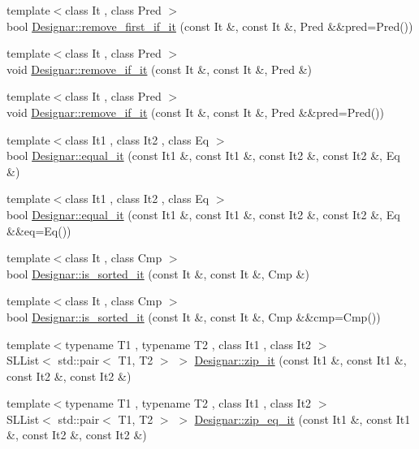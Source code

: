 \begin{DoxyCompactItemize}
{\footnotesize template$<$class It , class Pred $>$ }\\bool \hyperlink{namespace_designar_aaee4724db923890d1f8a85009922805f}{Designar\+::remove\+\_\+first\+\_\+if\+\_\+it} (const It \&, const It \&, Pred \&\&pred=Pred())
\item 
{\footnotesize template$<$class It , class Pred $>$ }\\void \hyperlink{namespace_designar_a4d9b53ca57cf3e6a1baf14e495c974a7}{Designar\+::remove\+\_\+if\+\_\+it} (const It \&, const It \&, Pred \&)
\item 
{\footnotesize template$<$class It , class Pred $>$ }\\void \hyperlink{namespace_designar_afe463efc1ccacf9b22f6e5ea0619b2ac}{Designar\+::remove\+\_\+if\+\_\+it} (const It \&, const It \&, Pred \&\&pred=Pred())
\item 
{\footnotesize template$<$class It1 , class It2 , class Eq $>$ }\\bool \hyperlink{namespace_designar_a72be3d25570a225bb5e468e62dd73984}{Designar\+::equal\+\_\+it} (const It1 \&, const It1 \&, const It2 \&, const It2 \&, Eq \&)
\item 
{\footnotesize template$<$class It1 , class It2 , class Eq $>$ }\\bool \hyperlink{namespace_designar_a022cf72b1e28929770af36d322a89c9d}{Designar\+::equal\+\_\+it} (const It1 \&, const It1 \&, const It2 \&, const It2 \&, Eq \&\&eq=Eq())
\item 
{\footnotesize template$<$class It , class Cmp $>$ }\\bool \hyperlink{namespace_designar_a2f33378e3e21b1dda9bbfa0c5537c174}{Designar\+::is\+\_\+sorted\+\_\+it} (const It \&, const It \&, Cmp \&)
\item 
{\footnotesize template$<$class It , class Cmp $>$ }\\bool \hyperlink{namespace_designar_a201bc6cc5dcc9525bc150e658a81ddbc}{Designar\+::is\+\_\+sorted\+\_\+it} (const It \&, const It \&, Cmp \&\&cmp=Cmp())
\item 
{\footnotesize template$<$typename T1 , typename T2 , class It1 , class It2 $>$ }\\S\+L\+List$<$ std\+::pair$<$ T1, T2 $>$ $>$ \hyperlink{namespace_designar_a16eafe2daeba2559854cb96696a48f59}{Designar\+::zip\+\_\+it} (const It1 \&, const It1 \&, const It2 \&, const It2 \&)
\item 
{\footnotesize template$<$typename T1 , typename T2 , class It1 , class It2 $>$ }\\S\+L\+List$<$ std\+::pair$<$ T1, T2 $>$ $>$ \hyperlink{namespace_designar_a03bdb23b13b2aed29e869046d99e5bc6}{Designar\+::zip\+\_\+eq\+\_\+it} (const It1 \&, const It1 \&, const It2 \&, const It2 \&)

\end{DoxyCompactItemize}
